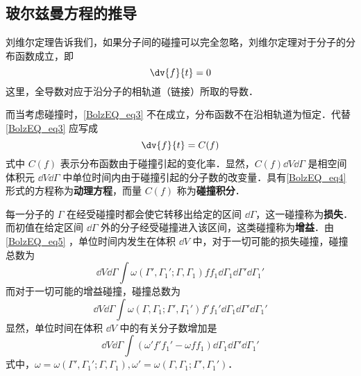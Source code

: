 \subsection{玻尔兹曼方程的推导}
 刘维尔定理告诉我们，如果分子间的碰撞可以完全忽略，刘维尔定理对于分子的分布函数成立，即
 \begin{equation}\label{BolzEQ_eq3}
 \dv{f}{t}=0
 \end{equation}
 这里，全导数对应于沿分子的相轨道（链接）所取的导数．

 而当考虑碰撞时，\autoref{BolzEQ_eq3} 不在成立，分布函数不在沿相轨道为恒定．代替\autoref{BolzEQ_eq3} 应写成
 \begin{equation}\label{BolzEQ_eq4}
 \dv{f}{t}=C(f)
 \end{equation}
 式中 $C(f)$ 表示分布函数由于碰撞引起的变化率．显然，$C(f)\dd V\dd\Gamma$ 是相空间体积元 $\dd V\dd\Gamma$ 中单位时间内由于碰撞引起的分子数的改变量．具有\autoref{BolzEQ_eq4} 形式的方程称为\textbf{动理方程}，而量 $C(f)$ 称为\textbf{碰撞积分}．

 每一分子的 $\Gamma$ 在经受碰撞时都会使它转移出给定的区间 $\dd\Gamma$，这一碰撞称为\textbf{损失}．而初值在给定区间 $\dd \Gamma$ 外的分子经受碰撞进入该区间，这类碰撞称为\textbf{增益}．由\autoref{BolzEQ_eq5} ，单位时间内发生在体积 $\dd V$ 中，对于一切可能的损失碰撞，碰撞总数为
 \begin{equation}
 \dd V\dd \Gamma\int\omega(\Gamma',\Gamma_1';\Gamma,\Gamma_1)ff_1\dd\Gamma_1\dd\Gamma'\dd\Gamma_1'
 \end{equation}
  而对于一切可能的增益碰撞，碰撞总数为
  \begin{equation}
  \dd V\dd \Gamma\int\omega(\Gamma,\Gamma_1;\Gamma',\Gamma_1')f'f_1'\dd\Gamma_1\dd\Gamma'\dd\Gamma_1'
  \end{equation}
  显然，单位时间在体积 $\dd V$ 中的有关分子数增加是
  \begin{equation}\label{BolzEQ_eq6}
  \dd V\dd \Gamma\int(\omega'f'f_1'-\omega f f_1)\dd\Gamma_1\dd\Gamma'\dd\Gamma_1'
  \end{equation}
  式中，$\omega=\omega(\Gamma',\Gamma_1';\Gamma,\Gamma_1),\omega'=\omega(\Gamma,\Gamma_1;\Gamma',\Gamma_1')$．

